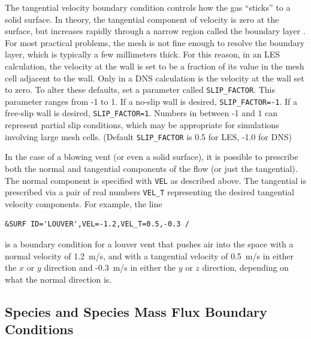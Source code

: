 \documentclass[11pt]{book}
\newcommand{\ct}{\tt\small}
\begin{document}
The tangential velocity boundary condition controls how the gas
``sticks'' to a solid surface. In theory, the tangential
component of velocity is zero at the surface, but
increases rapidly through a narrow region called the boundary layer .
For most practical problems, the mesh is not fine enough to resolve the
boundary layer, which is typically a few millimeters thick.
For this reason, in an LES calculation, the velocity at the wall
is set to be a fraction of its value in the mesh cell adjacent to the
wall. Only in a DNS calculation is the velocity at the wall set to zero.
To alter these defaults, set a parameter called
{\ct SLIP\_FACTOR}.  This parameter ranges
from -1 to 1. If a no-slip wall is desired, {\ct SLIP\_FACTOR=-1}. If
a free-slip wall is desired, {\ct SLIP\_FACTOR=1}. Numbers in between
-1 and 1 can represent partial slip conditions, which may be
appropriate for simulations involving large mesh cells.
(Default {\ct SLIP\_FACTOR} is 0.5 for LES, -1.0 for DNS)

In the case of a blowing vent (or even a solid surface),
it is possible to prescribe both the normal and tangential components of the flow (or just the tangential).
The normal component is specified with {\ct VEL} as described above. The tangential is prescribed
via a pair of real numbers {\ct VEL\_T} representing the desired tangential
velocity components. For example, the line

\footnotesize
\begin{verbatim}
&SURF ID='LOUVER',VEL=-1.2,VEL_T=0.5,-0.3 /
\end{verbatim}
\normalsize

\noindent
is a boundary condition for a louver vent that pushes air into the
space with a normal velocity of 1.2~m/s, and with a tangential velocity
of 0.5~m/s in either the $x$ or $y$ direction and -0.3~m/s in either
the $y$ or $z$ direction, depending on what the normal direction is.

\subsection{Species and Species Mass Flux Boundary Conditions}
\end{document}
